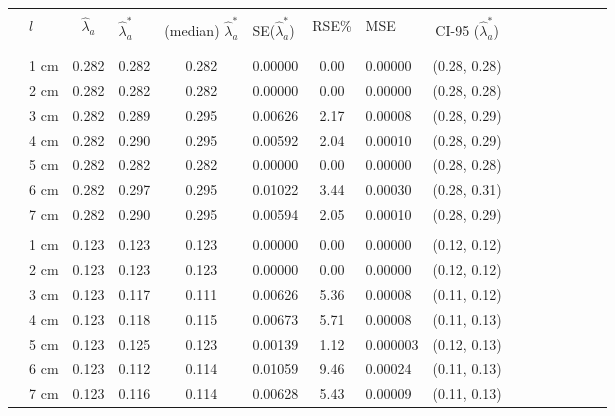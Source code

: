 \documentclass[a4paper 12pt]{article}
\numberwithin{equation}{section}
\begin{document}
{\clearpage
 \begin{small}
\begin{table}[h!]
\centering
\setlength\tabcolsep{10.5pt} 
\begin{footnotesize}
\begin{tabular}{clclclclclclclcl}
  \hline \\ [0.3ex]
&  $l$ & $\hat{\lambda}_{a}$  & $\hat{\lambda}_{a}^{*}$ & (median) $\hat{\lambda}_{a}^{*}$  & SE($\hat{\lambda}_{a}^{*}$) & RSE\%& MSE &  CI-95 ($\hat{\lambda}_{a}^{*}$) \\ [1.0ex]
\hline \\
 \raisebox{1ex}{\bf age 0}  \\ [1.0ex]
&   1 cm & 0.282  &    0.282 &  0.282 &  0.00000 & 0.00 & 0.00000 & (0.28, 0.28)\\
&   2 cm & 0.282  &    0.282 &  0.282 &  0.00000 & 0.00 & 0.00000 & (0.28, 0.28)\\
&   3 cm & 0.282  &    0.289 &  0.295 &  0.00626 & 2.17 & 0.00008 & (0.28, 0.29)\\
&   4 cm & 0.282  &    0.290 &  0.295 &  0.00592 & 2.04 & 0.00010 & (0.28, 0.29)\\
&   5 cm & 0.282  &    0.282 &  0.282 &  0.00000 & 0.00 & 0.00000 & (0.28, 0.28)\\
&   6 cm & 0.282  &    0.297 &  0.295 &  0.01022 & 3.44 & 0.00030 & (0.28, 0.31)\\
&   7 cm & 0.282  &    0.290 &  0.295 &  0.00594 & 2.05 & 0.00010 & (0.28, 0.29)\\[1.2ex]

 \raisebox{1ex}{\bf age 1}&  \\ [1.0ex]
&   1 cm & 0.123 &      0.123  & 0.123 & 0.00000  & 0.00 & 0.00000 & (0.12, 0.12)\\
&   2 cm & 0.123 &      0.123  & 0.123 & 0.00000  & 0.00 & 0.00000 & (0.12, 0.12)\\
&   3 cm & 0.123 &      0.117  & 0.111 & 0.00626  & 5.36 & 0.00008 & (0.11, 0.12)\\
&   4 cm & 0.123 &      0.118  & 0.115 & 0.00673  & 5.71 & 0.00008 & (0.11, 0.13) \\
&   5 cm & 0.123 &      0.125  & 0.123 & 0.00139  & 1.12 & 0.000003 & (0.12, 0.13) \\
&   6 cm & 0.123 &      0.112  & 0.114 & 0.01059  & 9.46 & 0.00024 & (0.11, 0.13)\\
&   7 cm & 0.123 &      0.116  & 0.114 & 0.00628  & 5.43 & 0.00009 & (0.11, 0.13)\\[1.2ex]


\end{tabular}
\end{footnotesize}
\end{table}
\end{small}}
\end{document}
